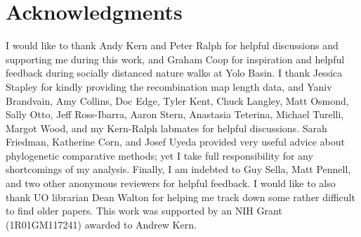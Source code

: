 \documentclass[9pt,lineno]{elife}
\begin{document}
\section{Acknowledgments}

I would like to thank Andy Kern and Peter Ralph for helpful discussions and
supporting me during this work, and Graham Coop for inspiration and helpful
feedback during socially distanced nature walks at Yolo Basin. I thank Jessica
Stapley for kindly providing the recombination map length data, and Yaniv
Brandvain, Amy Collins, Doc Edge, Tyler Kent, Chuck Langley, Matt Osmond, Sally
Otto, Jeff Ross-Ibarra, Aaron Stern, Anastasia Teterina, Michael Turelli,
Margot Wood, and my Kern-Ralph labmates for helpful discussions. Sarah
Friedman, Katherine Corn, and Josef Uyeda provided very useful advice about
phylogenetic comparative methods; yet I take full responsibility for any
shortcomings of my analysis. Finally, I am indebted to Guy Sella, Matt Pennell,
and two other anonymous reviewers for helpful feedback. I would like to also
thank UO librarian Dean Walton for helping me track down some rather difficult
to find older papers.  This work was supported by an NIH Grant (1R01GM117241)
awarded to Andrew Kern.







\end{document}
